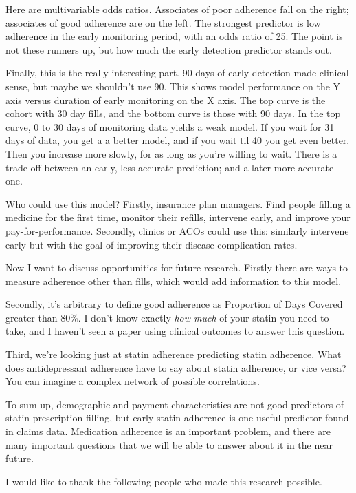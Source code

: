 \documentclass[12pt]{report}
\begin{document}
\begin{large}
Here are multivariable odds ratios. Associates of poor adherence fall
on the right; associates of good adherence are on the left. The
strongest predictor is low adherence in the early monitoring period,
with an odds ratio of 25. The point is not these runners up, but how
much the early detection predictor stands out. %

Finally, this is the really interesting part. 90 days of early
detection made clinical sense, but maybe we shouldn't use 90. This
shows model performance on the Y axis versus duration of early
monitoring on the X axis. The top curve is the cohort with 30 day
fills, and the bottom curve is those with 90 days. In the top curve, 0
to 30 days of monitoring data yields a weak model. If you wait for 31
days of data, you get a a better model, and if you wait til 40 you get
even better. Then you increase more slowly, for as long as you're
willing to wait. There is a trade-off between an early, less accurate
prediction; and a later more accurate one. %

Who could use this model? Firstly, insurance plan managers. Find
people filling a medicine for the first time, monitor their refills,
intervene early, and improve your pay-for-performance. Secondly,
clinics or ACOs could use this: similarly intervene early but with the
goal of improving their disease complication rates. %

Now I want to discuss opportunities for future research. First\-ly there
are ways to measure adherence other than fills, which would add
information to this model.

Secondly, it's arbitrary to define good adherence as Proportion of
Days Covered greater than 80\%. I don't know exactly \emph{how much}
of your statin you need to take, and I haven't seen a paper using
clinical outcomes to answer this question.

Third, we're looking just at statin adherence predicting statin
adherence. What does antidepressant adherence have to say about statin
adherence, or vice versa? You can imagine a complex network of
possible correlations.

To sum up, demographic and payment characteristics are not good
predictors of statin prescription filling, but early statin adherence
is one useful predictor found in claims data. Medication adherence is
an important problem, and there are many important questions that we
will be able to answer about it in the near future.

I would like to thank the following people who made this research
possible. %

\end{large}
\end{document}

